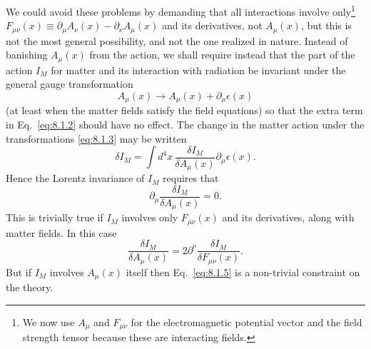 We could avoid these problems by demanding that all interactions
involve only\footnote{We now use $A_\mu$ and $F_{\mu\nu}$ for the electromagnetic
potential vector and the field strength tensor because these are interacting
fields.} $F_{\mu\nu}(x)\equiv\partial_\mu A_\nu(x)-\partial_\nu A_\mu(x)$ and its
derivatives, not $A_\mu(x)$, but this is not the most general possibility, and
not the one realized in nature. Instead of banishing $A_\mu(x)$ from the
action, we shall require instead that the part of the action $I_M$ for matter
and its interaction with radiation be invariant under the general gauge
transformation
\begin{equation}
  A_\mu(x)\longrightarrow A_\mu(x)+\partial_\mu\epsilon(x)
  \tag{8.1.3}\label{eq:8.1.3}
\end{equation}
(at least when the matter fields satisfy the field equations) so that the extra
term in Eq.~\eqref{eq:8.1.2} should have no effect. The change in the matter action
under the transformations \eqref{eq:8.1.3} may be written
\begin{equation}
  \delta I_M=\int d^4x\,\frac{\delta I_M}{\delta A_\mu(x)}
  \partial_\mu\epsilon(x).
  \tag{8.1.4}\label{eq:8.1.4}
\end{equation}
Hence the Lorentz invariance of $I_M$ requires that
\begin{equation}
  \partial_\mu\frac{\delta I_M}{\delta A_\mu(x)}=0.
  \tag{8.1.5}\label{eq:8.1.5}
\end{equation}
This is trivially true if $I_M$ involves only $F_{\mu\nu}(x)$ and its derivatives,
along with matter fields. In this case
\[
  \frac{\delta I_M}{\delta A_\mu(x)}
  =2\partial^\nu\frac{\delta I_M}{\delta F_{\mu\nu}(x)}.
\]
But if $I_M$ involves $A_\mu(x)$ itself then Eq.~\eqref{eq:8.1.5} is a non-trivial
constraint on the theory.

